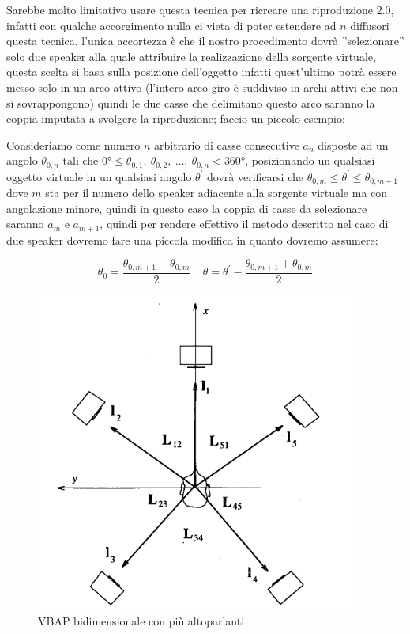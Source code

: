 \documentclass[12pt,a4paper]{report}
\begin{document}
\begin{itemize}
Sarebbe molto limitativo usare questa tecnica per ricreare una riproduzione 2.0, infatti con qualche accorgimento nulla ci vieta di poter estendere ad $n$ diffusori questa tecnica, l'unica accortezza è che il nostro procedimento dovrà ''selezionare'' solo due speaker alla quale attribuire la realizzazione della sorgente virtuale, questa scelta si basa sulla posizione dell'oggetto infatti quest'ultimo potrà essere messo solo in un arco attivo (l'intero arco giro è suddiviso in archi attivi che non si sovrappongono) quindi le due casse che delimitano questo arco saranno la coppia imputata a svolgere la riproduzione; faccio un piccolo esempio:

Consideriamo come numero $n$ arbitrario di casse consecutive $a_n$ disposte ad un angolo $\theta_{0,n}$ tali che $0°\leq \theta_{0,1},\ \theta_{0,2},\ \ldots,\ \theta_{0,n} <360°$, posizionando un qualsiasi oggetto virtuale in un qualsiasi angolo $\theta^{\prime}$ dovrà verificarsi che $\theta_{0,m}\leq \theta^{\prime} \leq \theta_{0,m+1}$ dove $m$ sta per il numero dello speaker adiacente alla sorgente virtuale ma con angolazione minore, quindi in questo caso la coppia di casse da selezionare saranno $a_m$ e $a_{m+1}$, quindi per rendere effettivo il metodo descritto nel caso di due speaker dovremo fare una piccola modifica in quanto dovremo assumere:

\begin{equation}
\theta_0 = \dfrac{\theta_{0,m+1}-\theta_{0,m}}{2} \ \ \ \ \ \theta=\theta^{\prime}-\dfrac{\theta_{0,m+1}+\theta_{0,m}}{2}
\label{phidiverso}
\end{equation}


 \begin{figure}[htbp]
	\centering
	\includegraphics[scale=0.55]{figures/matrix5-1.png}
	\caption {VBAP bidimensionale con più altoparlanti}
	\label{fig:angoli5}
	\end{figure}




\end{itemize}
\end{document}
